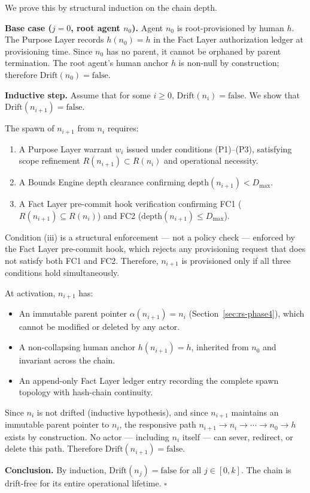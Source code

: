 \begin{Proof}
We prove this by structural induction on the chain depth.

\medskip
\noindent\textbf{Base case ($j=0$, root agent $n_0$).} Agent $n_0$ is root-provisioned by human $h$. The Purpose Layer records $h(n_0) = h$ in the Fact Layer authorization ledger at provisioning time. Since $n_0$ has no parent, it cannot be orphaned by parent termination. The root agent's human anchor $h$ is non-null by construction; therefore $\text{Drift}(n_0) = \text{false}$.

\medskip
\noindent\textbf{Inductive step.} Assume that for some $i \geq 0$, $\text{Drift}(n_i) = \text{false}$. We show that $\text{Drift}(n_{i+1}) = \text{false}$.

The spawn of $n_{i+1}$ from $n_i$ requires:
\begin{enumerate}
    \item[(i)] A Purpose Layer warrant $w_i$ issued under conditions (P1)–(P3), satisfying scope refinement $R(n_{i+1}) \subset R(n_i)$ and operational necessity.
    \item[(ii)] A Bounds Engine depth clearance confirming $\text{depth}(n_{i+1}) < D_{\max}$.
    \item[(iii)] A Fact Layer pre-commit hook verification confirming FC1 ($R(n_{i+1}) \subseteq R(n_i)$) and FC2 ($\text{depth}(n_{i+1}) \leq D_{\max}$).
\end{enumerate}

Condition (iii) is a structural enforcement — not a policy check — enforced by the Fact Layer pre-commit hook, which rejects any provisioning request that does not satisfy both FC1 and FC2. Therefore, $n_{i+1}$ is provisioned only if all three conditions hold simultaneously.

At activation, $n_{i+1}$ has:
\begin{itemize}
    \item An immutable parent pointer $\alpha(n_{i+1}) = n_i$ (Section~\ref{sec:rs-phase4}), which cannot be modified or deleted by any actor.
    \item A non-collapsing human anchor $h(n_{i+1}) = h$, inherited from $n_0$ and invariant across the chain.
    \item An append-only Fact Layer ledger entry recording the complete spawn topology with hash-chain continuity.
\end{itemize}

Since $n_i$ is not drifted (inductive hypothesis), and since $n_{i+1}$ maintains an immutable parent pointer to $n_i$, the responsive path $n_{i+1} \rightarrow n_i \rightarrow \cdots \rightarrow n_0 \rightarrow h$ exists by construction. No actor — including $n_i$ itself — can sever, redirect, or delete this path. Therefore $\text{Drift}(n_{i+1}) = \text{false}$.

\medskip
\noindent\textbf{Conclusion.} By induction, $\text{Drift}(n_j) = \text{false}$ for all $j \in [0, k]$. The chain is drift-free for its entire operational lifetime. $\square$
\end{Proof}

